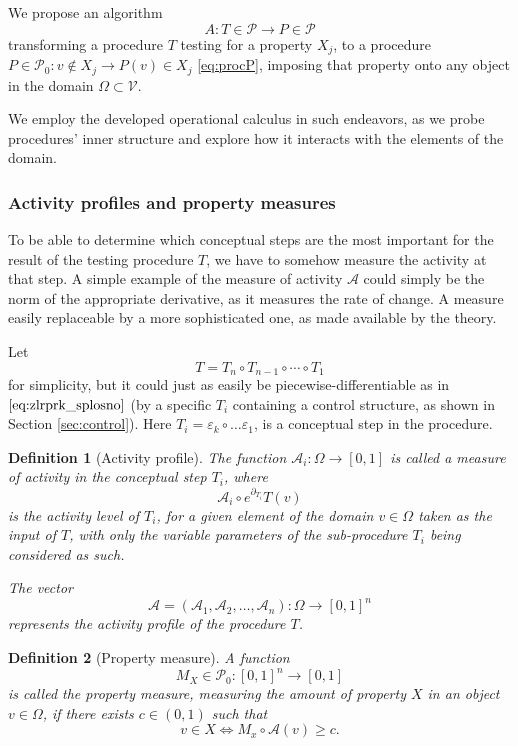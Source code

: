 \documentclass[preprint,12pt]{elsarticle}
\newcommand{\VV}{\mathcal{V}}
\newcommand{\dP}{\mathcal{P}}
\newcommand{\D}{\partial}
\newtheorem{definicija}{Definition}[section]
\begin{document}
   We propose an algorithm
   \begin{equation}\label{eq:algA}
     A:T\in\dP\to P\in\dP
     \end{equation}
     transforming a procedure $T$ testing for a property $X_j$, to a procedure
     $P\in \dP_0:v\notin X_j\to P(v)\in X_j$ \eqref{eq:procP}, imposing that
     property onto any object in the domain $\Omega\subset \VV$.
   
   We employ the developed operational calculus in such endeavors, as we probe
   procedures' inner structure and explore how it interacts with the elements of
   the domain.
 
\subsubsection{Activity profiles and property measures}\label{sec:propertyMeasure}
    
To be able to determine which conceptual steps are the most important for the
result of the testing procedure $T$, we have to somehow measure the activity
at that step. A simple example of the measure of activity $\mathcal{A}$ could simply be the norm of the
appropriate derivative, as it measures the rate of change. A measure easily replaceable by a more sophisticated one, as made available by the theory.

   Let 
   $$T=T_n\circ T_{n-1}\circ\cdots\circ T_1$$
   for simplicity, but it could just as easily be piecewise-differentiable as in $\eqref{eq:zlrprk_splosno}$ (by a specific $T_i$ containing a control structure, as shown in Section \ref{sec:control}). Here $T_i=\varepsilon_k\circ\ldots \varepsilon_1$, is a conceptual step in the procedure.
  
   
   \begin{definicija}[Activity profile]
   The function $\mathcal{A}_i:\Omega\to[0,1]$ is called a \emph{measure of activity} in the conceptual step $T_i$, where 
   $$\mathcal{A}_i\circ e^{\D_{T_i}}T(v)$$ 
   is the \emph{activity level} of $T_i$, for a given element of the domain $v\in \Omega$ taken as the input of $T$, with only the variable parameters of the sub-procedure $T_i$ being considered as such.
   
   The vector $$\mathcal{A}=(\mathcal{A}_1,\mathcal{A}_2,\dots,\mathcal{A}_n):\Omega\to[0,1]^n$$ represents the activity profile of the procedure $T$. 
   \end{definicija}
   
   
   \begin{definicija}[Property measure]
    A function 
    $$M_X\in\dP_0:[0,1]^n\to[0,1]$$  
    is called the property measure, measuring the amount of property $X$ in an object $v\in\Omega$, if there exists  $c\in(0,1)$ such that 
    $$v\in X\iff M_x\circ\mathcal{A}(v)\ge c.$$
    \end{definicija}
   
\end{document}
